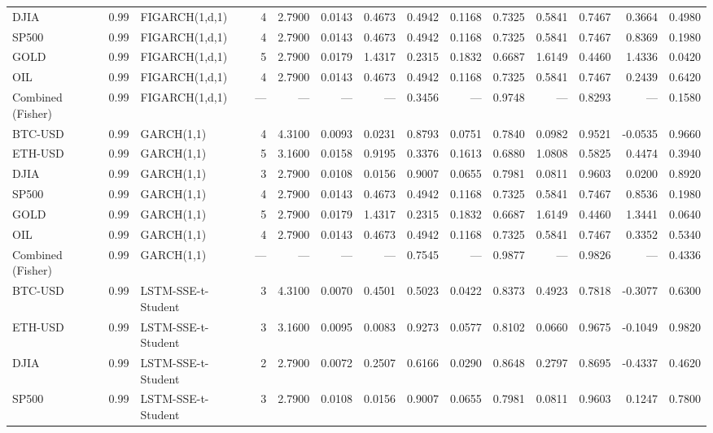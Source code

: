 \begin{table}[ht]
\begin{tabular}{lllrrrrrrrrrrr}
DJIA & 0.99 & FIGARCH(1,d,1) & 4 & 2.7900 & 0.0143 & 0.4673 & 0.4942 & 0.1168 & 0.7325 & 0.5841 & 0.7467 & 0.3664 & 0.4980 \\
SP500 & 0.99 & FIGARCH(1,d,1) & 4 & 2.7900 & 0.0143 & 0.4673 & 0.4942 & 0.1168 & 0.7325 & 0.5841 & 0.7467 & 0.8369 & 0.1980 \\
GOLD & 0.99 & FIGARCH(1,d,1) & 5 & 2.7900 & 0.0179 & 1.4317 & 0.2315 & 0.1832 & 0.6687 & 1.6149 & 0.4460 & 1.4336 & 0.0420 \\
OIL & 0.99 & FIGARCH(1,d,1) & 4 & 2.7900 & 0.0143 & 0.4673 & 0.4942 & 0.1168 & 0.7325 & 0.5841 & 0.7467 & 0.2439 & 0.6420 \\
Combined (Fisher) & 0.99 & FIGARCH(1,d,1) & — & — & — & — & 0.3456 & — & 0.9748 & — & 0.8293 & — & 0.1580 \\
BTC-USD & 0.99 & GARCH(1,1) & 4 & 4.3100 & 0.0093 & 0.0231 & 0.8793 & 0.0751 & 0.7840 & 0.0982 & 0.9521 & -0.0535 & 0.9660 \\
ETH-USD & 0.99 & GARCH(1,1) & 5 & 3.1600 & 0.0158 & 0.9195 & 0.3376 & 0.1613 & 0.6880 & 1.0808 & 0.5825 & 0.4474 & 0.3940 \\
DJIA & 0.99 & GARCH(1,1) & 3 & 2.7900 & 0.0108 & 0.0156 & 0.9007 & 0.0655 & 0.7981 & 0.0811 & 0.9603 & 0.0200 & 0.8920 \\
SP500 & 0.99 & GARCH(1,1) & 4 & 2.7900 & 0.0143 & 0.4673 & 0.4942 & 0.1168 & 0.7325 & 0.5841 & 0.7467 & 0.8536 & 0.1980 \\
GOLD & 0.99 & GARCH(1,1) & 5 & 2.7900 & 0.0179 & 1.4317 & 0.2315 & 0.1832 & 0.6687 & 1.6149 & 0.4460 & 1.3441 & 0.0640 \\
OIL & 0.99 & GARCH(1,1) & 4 & 2.7900 & 0.0143 & 0.4673 & 0.4942 & 0.1168 & 0.7325 & 0.5841 & 0.7467 & 0.3352 & 0.5340 \\
Combined (Fisher) & 0.99 & GARCH(1,1) & — & — & — & — & 0.7545 & — & 0.9877 & — & 0.9826 & — & 0.4336 \\
BTC-USD & 0.99 & LSTM-SSE-t-Student & 3 & 4.3100 & 0.0070 & 0.4501 & 0.5023 & 0.0422 & 0.8373 & 0.4923 & 0.7818 & -0.3077 & 0.6300 \\
ETH-USD & 0.99 & LSTM-SSE-t-Student & 3 & 3.1600 & 0.0095 & 0.0083 & 0.9273 & 0.0577 & 0.8102 & 0.0660 & 0.9675 & -0.1049 & 0.9820 \\
DJIA & 0.99 & LSTM-SSE-t-Student & 2 & 2.7900 & 0.0072 & 0.2507 & 0.6166 & 0.0290 & 0.8648 & 0.2797 & 0.8695 & -0.4337 & 0.4620 \\
SP500 & 0.99 & LSTM-SSE-t-Student & 3 & 2.7900 & 0.0108 & 0.0156 & 0.9007 & 0.0655 & 0.7981 & 0.0811 & 0.9603 & 0.1247 & 0.7800 \\

\end{tabular}
\end{table}
